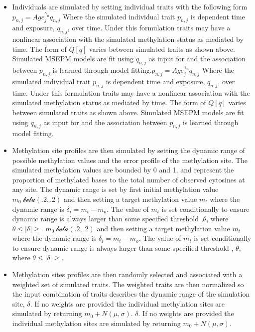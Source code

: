 \documentclass{article}
\begin{document}
{\begin{linenumbers}
\begin{itemize}
    \item{Individuals are simulated by setting individual traits with the following form 
    $p_{n,j} = Age_j^{\gamma_{n}} q_{n,j}$ Where the simulated individual trait $p_{n,j}$ is 
    dependent time and exposure, $q_{n,j}$, over time. Under this formulation traits may have a 
    nonlinear association with the simulated methylation status as mediated by time. The form of  $Q[q]$ varies 
    between simulated traits as shown above. Simulated MSEPM models are fit using $q_{n,j}$ as input for and the 
    association between $p_{n,j}$ is learned through model fitting.$p_{n,j} = Age_j^{\gamma_{n}} q_{n,j}$ Where 
    the simulated individual trait $p_{n,j}$ is dependent time and exposure, $q_{n,j}$, over time. Under this 
    formulation traits may have a nonlinear association with the simulated methylation status as mediated by time. 
    The form of  $Q[q]$ varies between simulated traits as shown above. Simulated MSEPM models are fit
    using $q_{n,j}$ as input for and the association between $p_{n,j}$ is learned through model fitting.}
    \item{Methylation site profiles are then simulated by setting the dynamic range of possible methylation values 
    and the error profile of the methylation site. The simulated methylation values are bounded by 0 and 1, and 
    represent the proportion of methylated bases to the total number of observed cytosines at any site. The 
    dynamic range is set by first initial methylation value $m_0 ~ \mathcal{beta}(.2,.2)$ and then setting a 
    target methylation value $m_t$ where the dynamic range is $\delta_i = m_t - m_o$. The value of $m_t$ is 
    set conditionally to ensure dynamic range is always larger than some specified threshold ,$\theta$, where 
    $ \theta \leq|\delta| \geq$. $m_0 ~ \mathcal{beta}(.2,.2)$ and then setting a target methylation value 
    $m_t$ where the dynamic range is $\delta_i = m_t - m_o$. The value of $m_t$ is set conditionally to 
    ensure dynamic range is always larger than some specified threshold ,
    $\theta$, where $ \theta \leq|\delta| \geq$. }
    \item{Methylation sites profiles are then randomly selected and associated with a weighted set of simulated 
    traits. The weighted traits are then normalized so the input combination of traits describes the dynamic 
    range of the simulation site, $\delta$. If no weights are provided the individual methylation sites are 
    simulated by returning $m_0 + N(\mu, \sigma)$. $\delta$. If no weights are provided the individual 
    methylation sites are simulated by returning $m_0 + N(\mu, \sigma)$. }
\end{itemize}
 


\end{linenumbers}}
\end{document}
